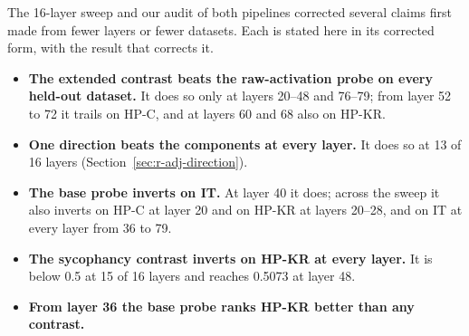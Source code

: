 The 16-layer sweep and our audit of both pipelines corrected several claims first made from fewer layers or fewer datasets.
Each is stated here in its corrected form, with the result that corrects it.
\begin{itemize}
\item \textbf{The extended contrast beats the raw-activation probe on every held-out dataset.} %
It does so only at layers 20--48 and 76--79; from layer 52 to 72 it trails on HP-C, and at layers 60 and 68 also on HP-KR. %
\item \textbf{One direction beats the components at every layer.} %
It does so at 13 of 16 layers (Section~\ref{sec:r-adj-direction}). %
\item \textbf{The base probe inverts on IT.} %
At layer 40 it does; across the sweep it also inverts on HP-C at layer 20 and on HP-KR at layers 20--28, and on IT at every layer from 36 to 79. %
\item \textbf{The sycophancy contrast inverts on HP-KR at every layer.} %
It is below 0.5 at 15 of 16 layers and reaches 0.5073 at layer 48. %
\item \textbf{From layer 36 the base probe ranks HP-KR better than any contrast.} %

\end{itemize}
